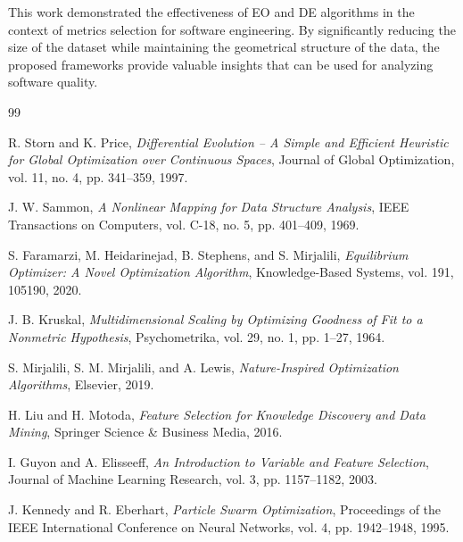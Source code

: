 \documentclass{styles/svproc}
\begin{document}
This work demonstrated the effectiveness of EO and DE algorithms in the context of metrics selection for software engineering. By significantly reducing the size of the dataset while maintaining the geometrical structure of the data, the proposed frameworks provide valuable insights that can be used for analyzing software quality.

%
%
\begin{thebibliography}{99}

R. Storn and K. Price,  
\textit{Differential Evolution – A Simple and Efficient Heuristic for Global Optimization over Continuous Spaces},  
Journal of Global Optimization, vol. 11, no. 4, pp. 341–359, 1997.  

J. W. Sammon,  
\textit{A Nonlinear Mapping for Data Structure Analysis},  
IEEE Transactions on Computers, vol. C-18, no. 5, pp. 401–409, 1969.  

S. Faramarzi, M. Heidarinejad, B. Stephens, and S. Mirjalili,  
\textit{Equilibrium Optimizer: A Novel Optimization Algorithm},  
Knowledge-Based Systems, vol. 191, 105190, 2020.  

J. B. Kruskal,  
\textit{Multidimensional Scaling by Optimizing Goodness of Fit to a Nonmetric Hypothesis},  
Psychometrika, vol. 29, no. 1, pp. 1–27, 1964.  


S. Mirjalili, S. M. Mirjalili, and A. Lewis,  
\textit{Nature-Inspired Optimization Algorithms},  
Elsevier, 2019.  

H. Liu and H. Motoda,  
\textit{Feature Selection for Knowledge Discovery and Data Mining},  
Springer Science \& Business Media, 2016.  

I. Guyon and A. Elisseeff,  
\textit{An Introduction to Variable and Feature Selection},  
Journal of Machine Learning Research, vol. 3, pp. 1157–1182, 2003.  

J. Kennedy and R. Eberhart,  
\textit{Particle Swarm Optimization},  
Proceedings of the IEEE International Conference on Neural Networks, vol. 4, pp. 1942–1948, 1995.  


\end{thebibliography}
\end{document}
